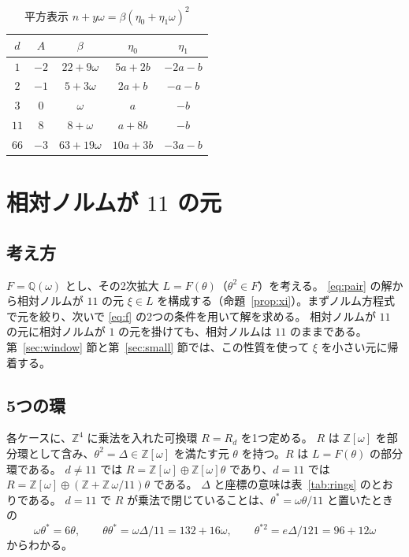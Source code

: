 \documentclass[a4paper,11pt]{ltjsarticle}
\theoremstyle{jplain}
\numberwithin{equation}{section}
\numberwithin{table}{section}
\newcommand{\Z}{\mathbb{Z}}
\newcommand{\Q}{\mathbb{Q}}
\newcommand{\tsec}[2]{\texorpdfstring{#1}{#2}}
\begin{document}
\begin{table}[htbp]
\centering
\caption{平方表示 $n+y\omega=\beta(\eta_0+\eta_1\omega)^2$}\label{tab:beta}
\begin{tabular}{ccccc}
\toprule
$d$ & $A$ & $\beta$ & $\eta_0$ & $\eta_1$\\
\midrule
$1$ & $-2$ & $22+9\omega$ & $5a+2b$ & $-2a-b$\\
$2$ & $-1$ & $5+3\omega$ & $2a+b$ & $-a-b$\\
$3$ & $0$ & $\omega$ & $a$ & $-b$\\
$11$ & $8$ & $8+\omega$ & $a+8b$ & $-b$\\
$66$ & $-3$ & $63+19\omega$ & $10a+3b$ & $-3a-b$\\
\bottomrule
\end{tabular}
\end{table}

\section{相対ノルムが \tsec{$11$}{11} の元}\label{sec:norm11}

\subsection{考え方}

$F=\Q(\omega)$ とし、その2次拡大 $L=F(\theta)$（$\theta^2\in F$）を考える。
\eqref{eq:pair} の解から相対ノルムが $11$ の元 $\xi\in L$ を構成する（命題~\ref{prop:xi}）。まずノルム方程式で元を絞り、次いで \eqref{eq:f} の2つの条件を用いて解を求める。
相対ノルムが $11$ の元に相対ノルムが $1$ の元を掛けても、相対ノルムは $11$ のままである。
第~\ref{sec:window} 節と第~\ref{sec:small} 節では、この性質を使って $\xi$ を小さい元に帰着する。

\subsection{5つの環}

各ケースに、$\Z^4$ に乗法を入れた可換環 $R=R_d$ を1つ定める。
$R$ は $\Z[\omega]$ を部分環として含み、$\theta^2=\Delta\in\Z[\omega]$ を満たす元 $\theta$ を持つ。$R$ は $L=F(\theta)$ の部分環である。
$d\ne11$ では $R=\Z[\omega]\oplus\Z[\omega]\theta$ であり、$d=11$ では $R=\Z[\omega]\oplus(\Z+\Z\,\omega/11)\theta$ である。
$\Delta$ と座標の意味は表~\ref{tab:rings} のとおりである。
$d=11$ で $R$ が乗法で閉じていることは、$\theta^*=\omega\theta/11$ と置いたときの
\[
\omega\theta^*=6\theta,\qquad\theta\theta^*=\omega\Delta/11=132+16\omega,\qquad\theta^{*2}=e\Delta/121=96+12\omega
\]
からわかる。
\end{document}

